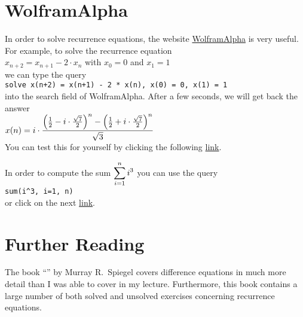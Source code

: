 \section{WolframAlpha}
In order to solve recurrence equations, the website \href{https://www.wolframalpha.com/}{WolframAlpha}
 is very useful.  For example, to solve the recurrence equation
\\[0.2cm]
\hspace*{1.3cm}
$x_{n+2} = x_{n+1} - 2 \cdot x_n$ \quad with $x_0 = 0$ and $x_1 = 1$ 
\\[0.2cm]
we can type the query
\\[0.2cm]
\hspace*{1.3cm}
\texttt{solve x(n+2) = x(n+1) - 2 * x(n), x(0) = 0, x(1) = 1}
\\[0.2cm]
into the search field of WolframAlpha.  After a few seconds, we will get back the answer
\\[0.2cm]
\hspace*{1.3cm}
$\displaystyle x(n) = i \cdot \frac{\left(\frac{1}{2} - i \cdot\frac{\sqrt{7}}{2}\right)^n -
                          \left(\frac{1}{2} + i \cdot\frac{\sqrt{7}}{2}\right)^n}{\sqrt{3}}$
\\[0.2cm]
You can test this for yourself by clicking the following                        
\href{https://www.wolframalpha.com/input?i=solve+x%28n%2B2%29+%3D+x%28n%2B1%29+-+2+*+x%28n%29%2C+x%280%29+%3D+0%2C+x%281%29+%3D+1}{link}.

In order to compute the sum $\displaystyle\sum\limits_{i=1}^n i^3$ you can use the query
\\[0.2cm]
\hspace*{1.3cm}
\texttt{sum(i\^{ }3, i=1, n)}
\\[0.2cm]
or click on the next \href{https://www.wolframalpha.com/input?i=sum%28i%5E3%2C+i%3D1%2C+n%29}{link}.




\section{Further Reading}
The book ``'' by Murray R.~Spiegel
\cite{spiegel:1971} covers difference equations in much more detail than I was able to cover in my lecture.
Furthermore, this book contains a large number of both solved and unsolved exercises concerning
recurrence equations. 


